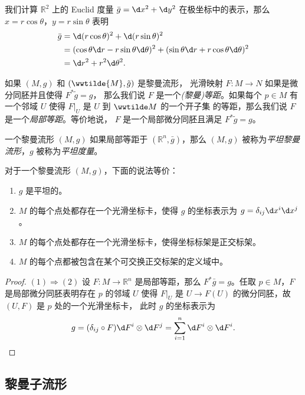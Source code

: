 \begin{example}\label{exa:polar coordinate of euclid metric}
  我们计算 $\mathbb{R}^2$ 上的 Euclid 度量 $\bar g=\d x^2+\d y^2$
  在极坐标中的表示，那么 $x=r\cos\theta$，$y=r\sin\theta$ 表明
  \begin{align*}
    \bar g&=\d (r\cos\theta)^2+\d (r\sin\theta)^2\\
    &=(\cos\theta\d r-r\sin\theta\d\theta)^2+(\sin\theta\d r+r\cos\theta\d\theta)^2\\
    &=\d r^2+r^2\d\theta^2.
  \end{align*}
\end{example}

如果 $(M,g)$ 和 $(\wwtilde{M},\tilde g)$ 是黎曼流形，
光滑映射 $F:M\to N$ 如果是微分同胚并且使得 $F^*\tilde g=g$，
那么我们说 $F$ 是一个\emph{(黎曼)等距}。如果每个 $p\in M$
有一个邻域 $U$ 使得 $F|_U$ 是 $U$ 到 $\wwtilde M$ 的一个开子集
的等距，那么我们说 $F$ 是一个\emph{局部等距}。等价地说，
$F$ 是一个局部微分同胚且满足 $F^*\tilde{g}=g$。

一个黎曼流形 $(M,g)$ 如果局部等距于 $(\mathbb{R}^n,\bar g)$，那么
$(M,g)$ 被称为\emph{平坦黎曼流形}，$g$ 被称为\emph{平坦度量}。

\begin{theorem}
  对于一个黎曼流形 $(M,g)$，下面的说法等价：
  \begin{enumerate}
    \item $g$ 是平坦的。
    \item $M$ 的每个点处都存在一个光滑坐标卡，使得 $g$ 的坐标表示为
    $g=\delta_{ij}\d x^i\d x^j$。
    \item $M$ 的每个点处都存在一个光滑坐标卡，使得坐标标架是正交标架。
    \item $M$ 的每个点都被包含在某个可交换正交标架的定义域中。
  \end{enumerate}
\end{theorem}
\begin{proof}
  $(1)\Rightarrow (2)$ 设 $F:M\to \mathbb{R}^n$ 是局部等距，那么
  $F^*\bar g=g$。任取 $p\in M$，$F$ 是局部微分同胚表明存在 $p$ 的邻域 $U$ 使得 $F|_U$
  是 $U\to F(U)$ 的微分同胚，故 $(U,F)$ 是 $p$ 处的一个光滑坐标卡，
  此时 $g$ 的坐标表示为
  \[
    g=(\delta_{ij}\circ F) \d F^i\otimes \d F^j=\sum_{i=1}^n
    \d F^i\otimes \d F^i.\qedhere
  \]
\end{proof}


\subsection{黎曼子流形}

